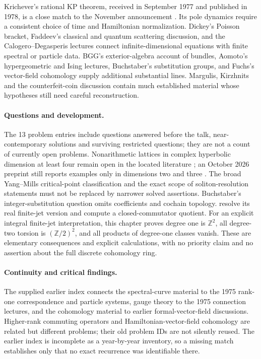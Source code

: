 Krichever's rational KP theorem, received in September 1977 and published
in 1978, is a close match to the November announcement
\citep[Theorem~3]{krichever1978rational}. Its pole dynamics require a
consistent choice of time and Hamiltonian normalization. Dickey's Poisson
bracket, Faddeev's classical and quantum scattering discussion, and the
Calogero--Degasperis lectures connect infinite-dimensional equations with
finite spectral or particle data. BGG's exterior-algebra account of bundles,
Aomoto's hypergeometric and Ising lectures, Buchstaber's substitution groups,
and Fuchs's vector-field cohomology supply additional substantial lines.
Margulis, Kirzhnits and the counterfeit-coin discussion contain much
established material whose hypotheses still need careful reconstruction.

\paragraph{Questions and development.}
The 13 problem entries include questions answered before the talk,
near-contemporary solutions and surviving restricted questions; they are
not a count of currently open problems. Nonarithmetic lattices in complex
hyperbolic dimension at least four remain open in the located literature
\citep[Introduction]{falbelpasquinelli2023hybrid}; an October 2026 preprint
still reports examples only in dimensions two and three
\citep[Introduction]{yu2026mirror}. The broad Yang--Mills
critical-point classification and the exact scope of soliton-resolution
statements must not be replaced by narrower solved assertions. Buchstaber's
integer-substitution question omits coefficients and cochain topology.
\citet[Theorems~1.2 and~1.5]{babenkobogatyi2008substitutions} resolve its
real finite-jet version and compute a closed-commutator quotient. For an
explicit integral finite-jet interpretation, this chapter proves degree
one is \(\mathbb Z^2\), all degree-two torsion is \((\mathbb Z/2)^2\),
and all products of degree-one classes vanish. These are elementary
consequences and explicit calculations, with no priority claim and no
assertion about the full discrete cohomology ring.

\paragraph{Continuity and critical findings.}
The supplied earlier index connects the spectral-curve material to the
1975 rank-one correspondence and particle systems, gauge theory to the
1975 connection lectures, and the cohomology material to earlier
formal-vector-field discussions. Higher-rank commuting operators and
Hamiltonian-vector-field cohomology are related but different problems;
their old problem IDs are not silently reused. The earlier index is
incomplete as a year-by-year inventory, so a missing match establishes
only that no exact recurrence was identifiable there.

